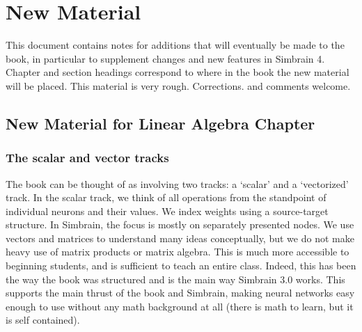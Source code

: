 \chapter{New Material}


This document contains notes for additions that will eventually be made to the book, in particular to supplement changes and new features in Simbrain 4. Chapter and section headings correspond to where in the book the new material will be placed. This material is very rough. Corrections. and comments welcome.

\section{New Material for Linear Algebra Chapter}

 
\subsection{The scalar and vector tracks}



The book  can be thought of as involving two tracks: a `scalar' and a `vectorized' track. In the scalar track, we think of all operations from the standpoint of individual neurons and their values. We index weights using a source-target structure. In Simbrain, the focus is mostly on separately presented nodes. We use vectors and matrices to understand many ideas conceptually, but we do not make heavy use of matrix products or matrix algebra. This is much more accessible to beginning students, and is sufficient to teach an entire class. Indeed, this has been the way the book was structured and is the main way Simbrain 3.0 works. This supports the main thrust of the book and Simbrain, making neural networks easy enough to use without any math background at all (there is math to learn, but it is self contained). 

